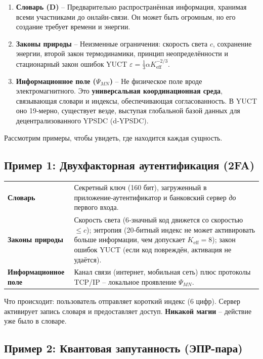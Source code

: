 \documentclass[12pt,a4paper]{article}
\begin{document}
	\begin{enumerate}
		\item \textbf{Словарь (D)} – Предварительно распространённая информация, хранимая всеми участниками до онлайн‑связи. Он может быть огромным, но его создание требует времени и энергии.
		\item \textbf{Законы природы} – Неизменные ограничения: скорость света \(c\), сохранение энергии, второй закон термодинамики, принцип неопределённости и стационарный закон ошибок YUCT \(\varepsilon = \frac13 \alpha K_{\mathrm{eff}}^{-2/3}\).
		\item \textbf{Информационное поле (\(\Psi_{MN}\))} – Не физическое поле вроде электромагнитного. Это \textbf{универсальная координационная среда}, связывающая словари и индексы, обеспечивающая согласованность. В YUCT оно 19‑мерно, существует везде, выступая глобальной базой данных для децентрализованного YPSDC (d‑YPSDC).
	\end{enumerate}
	
	Рассмотрим примеры, чтобы увидеть, где находится каждая сущность.
	
	\subsection{Пример 1: Двухфакторная аутентификация (2FA)}
	
	\begin{tabular}{p{2.8cm} p{10cm}}
		\textbf{Словарь} & Секретный ключ (160 бит), загруженный в приложение‑аутентификатор и банковский сервер \emph{до} первого входа. \\
		\textbf{Законы природы} & Скорость света (6‑значный код движется со скоростью \(\le c\)); энтропия (20‑битный индекс не может активировать больше информации, чем допускает \(K_{\mathrm{eff}}=8\)); закон ошибок YUCT (если код повреждён, активация не удаётся). \\
		\textbf{Информационное поле} & Канал связи (интернет, мобильная сеть) плюс протоколы TCP/IP – локальное проявление \(\Psi_{MN}\). \\
	\end{tabular}
	
	\noindent Что происходит: пользователь отправляет короткий индекс (6 цифр). Сервер активирует запись словаря и предоставляет доступ. \textbf{Никакой магии} – действие уже было в словаре.
	
	\subsection{Пример 2: Квантовая запутанность (ЭПР-пара)}
	
\end{document}
